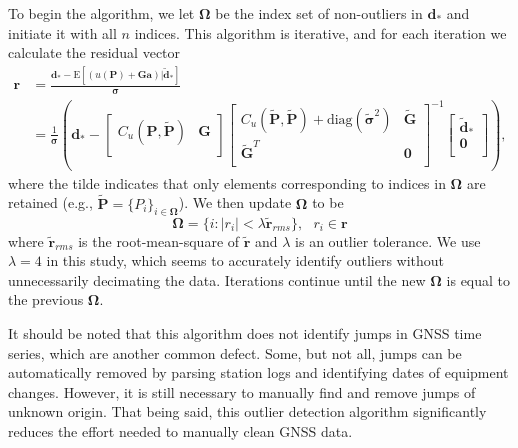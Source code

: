 \documentclass[10pt,letter]{article}
\begin{document}
To begin the algorithm, we let $\bm{\Omega}$ be the index set of non-outliers in $\bm{d}_*$ and initiate it with all $n$ indices. This algorithm is iterative, and for each iteration we calculate the residual vector
\begin{align}\label{eq:Residual}
\bm{r} &= \frac{\bm{d}_* - \mathrm{E}\left[(u(\bm{P}) + \bm{G}\bm{a})|\tilde{\bm{d}}_* \right]}{\bm{\sigma}} \\
       &= \frac{1}{\bm{\sigma}}\left(\bm{d}_*  - 
          \left[\begin{array}{cc}
                C_u(\bm{P},\tilde{\bm{P}}) & \bm{G} \\
                \end{array}\right]
          \left[\begin{array}{cc}
                C_u(\tilde{\bm{P}},\tilde{\bm{P}}) + \mathrm{diag}(\tilde{\bm{\sigma}}^2) & \tilde{\bm{G}} \\
                \tilde{\bm{G}}^T  & \bm{0} \\
                \end{array}\right]^{-1}
          \left[\begin{array}{c}
                \tilde{\bm{d}}_* \\
                \bm{0} \\
                \end{array}\right]\right),
\end{align}
where the tilde indicates that only elements corresponding to indices in $\bm{\Omega}$ are retained (e.g., $\tilde{\bm{P}} = \{P_i\}_{i\in\bm{\Omega}}$). We then update $\bm{\Omega}$ to be
\begin{equation}\label{eq:Update}
\bm{\Omega} = \{i : |r_i| < \lambda \tilde{\bm{r}}_{rms}\}, \ \ \ r_i \in \bm{r}
\end{equation} 
where $\tilde{\bm{r}}_{rms}$ is the root-mean-square of $\tilde{\bm{r}}$ and $\lambda$ is an outlier tolerance. We use $\lambda=4$ in this study, which seems to accurately identify outliers without unnecessarily decimating the data. Iterations continue until the new $\bm{\Omega}$ is equal to the previous $\bm{\Omega}$. 

It should be noted that this algorithm does not identify jumps in GNSS time series, which are another common defect. Some, but not all, jumps can be automatically removed by parsing station logs and identifying dates of equipment changes. However, it is still necessary to manually find and remove jumps of unknown origin. That being said, this outlier detection algorithm significantly reduces the effort needed to manually clean GNSS data.       
\end{document}
